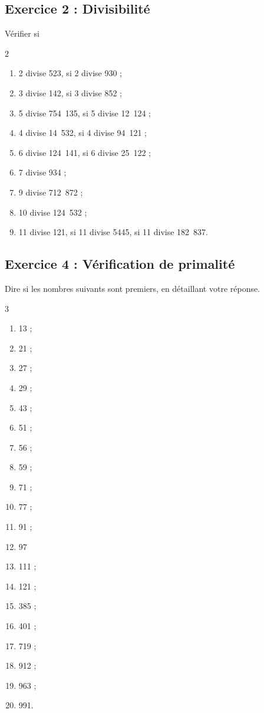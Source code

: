 \documentclass[14 pt]{extarticle}
\theoremstyle{plain}
\begin{document}
  \subsection*{Exercice 2 : Divisibilité}
Vérifier si \begin{multicols}{2}\begin{enumerate}
\item 2 divise 523, si 2 divise 930 ;
\item 3 divise 142, si 3 divise 852 ;
\item 5 divise 754~135, si 5 divise 12~124 ;
\item 4 divise 14~532, si 4 divise 94~121 ;
\item 6 divise 124~141, si 6 divise 25~122 ;
\item 7 divise 934 ;
\item 9 divise 712~872 ;
\item 10 divise 124~532 ;
\item 11 divise 121, si 11 divise 5445, si 11 divise 182~837.
\end{enumerate}
\end{multicols}


  \subsection*{Exercice 4 : Vérification de primalité}
Dire si les nombres suivants sont premiers, en détaillant votre réponse. \begin{multicols}{3}
\begin{enumerate}
\item 13 ;
\item 21 ;
\item 27 ; 
\item 29 ; 
\item 43 ; 
\item 51 ; 
\item 56 ;
\item 59 ; 
\item 71 ;
\item 77 ; 
\item 91 ;
\item 97
\item 111 ; 
\item 121 ; 
\item 385 ; 
\item 401 ; 
\item 719 ; 
\item 912 ; 
\item 963 ; 
\item 991. 
\end{enumerate}\end{multicols}
\end{document}
